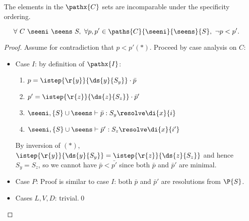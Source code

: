 The elements in the $\pathx{C}$ sets are incomparable under the specificity ordering.

\begin{lemma}\label{lemma:notinf}
\begin{equation*}
\forall\ C\ \seeni\ \seens\ S,\ \forall p, p' \in \paths{C}{\seeni}{\seens}{S},\ \neg p < p'.
\end{equation*}
\end{lemma}
\begin{proof} Assume for contradiction that $p < p' (*)$. Proceed by case analysis on $C$:
  \begin{itemize}
   \item Case $I$: by definition of $\pathx{I}$:
    \begin{enumerate}[leftmargin=15mm]
     \item $p = \istep{\r{y}}{\ds{y}{S_y}}\cdot \bar{p}$ 
     \item $p' = \istep{\r{z}}{\ds{z}{S_z}}\cdot \bar{p}'$
     \item $\seeni,\{S\}\cup\seens \vdash \bar{p} : S_y \resolve \di{x}{i} $
     \item $\seeni,\{S\}\cup\seens \vdash \bar{p}' : S_z \resolve \di{x}{i'} $
    \end{enumerate}
    By inversion of $(*)$, $\istep{\r{y}}{\ds{y}{S_y}} = \istep{\r{z}}{\ds{z}{S_z}}$ and hence $S_y = S_z$, so we cannot have $\bar{p} < \bar{p'}$ since both $\bar{p}$ and $\bar{p}'$ are minimal.
    \item Case $P$: Proof is similar to case $I$: both $\bar{p}$ and $\bar{p}'$ are resolutions from $\P{S}$.
    \item Cases $L,V,D$: trivial.\qed
  \end{itemize}
\end{proof}


\newcommand{\Case}[1]{\textbf{Case #1}:}
\renewcommand{\theenumi}{\arabic{enumi}}
\renewcommand{\labelenumi}{\theenumi)}


